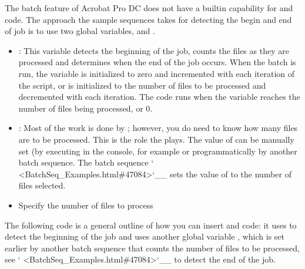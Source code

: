 \documentclass[letterpaper,12pt,english,openany,oneside]{sphinxmanual}
\begin{document}
The batch feature of Acrobat Pro DC does not have a built\sphinxhyphen{}in capability for  and  code. The approach the sample sequences takes for detecting the begin and end of job is to use two global variables,  and  .
\begin{itemize}
\item {} 
 : This variable detects the beginning of the job, counts the files as they are processed and determines when the end of the job occurs. When the batch is run, the variable is initialized to zero and incremented with each iteration of the script, or is initialized to the number of files to be processed and decremented with each iteration. The  code runs when the variable reaches the number of files being processed, or 0.

\item {} 
 : Most of the work is done by  ; however, you do need to know how many files are to be processed. This is the role the  plays. The value of  can be manually set (by executing  \sphinxcode{\sphinxupquote{=}}  in the console, for example \sphinxcode{\sphinxupquote{)}} or programmatically by another batch sequence. The batch sequence ` <BatchSeq\_Examples.html\#47084>`\_\_ sets the value of  to the number of files selected.

\item {} 
Specify the number of files to process

\end{itemize}

The following code is a general outline of how you can insert  and  code: it uses  to detect the beginning of the job and uses another global variable  , which is set earlier by another batch sequence that counts the number of files to be processed, see ` <BatchSeq\_Examples.html\#47084>`\_\_ to detect the end of the job.
\end{document}
